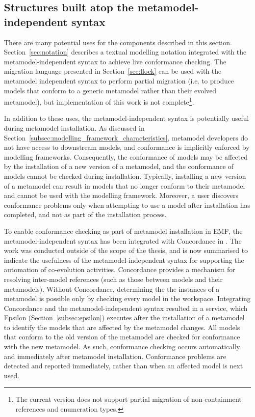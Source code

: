 \subsection{Structures built atop the metamodel-independent syntax}
There are many potential uses for the components described in this section. Section~\ref{sec:notation} describes a textual modelling notation integrated with the metamodel-independent syntax to achieve live conformance checking. The migration language presented in Section~\ref{sec:flock} can be used with the metamodel independent syntax to perform partial migration (i.e. to produce models that conform to a generic metamodel rather than their evolved metamodel), but implementation of this work is not complete\footnote{The current version does not support partial migration of non-containment references and enumeration types.}.

In addition to these uses, the metamodel-independent syntax is potentially useful during metamodel installation. As discussed in Section~\ref{subsec:modelling_framework_characteristics}, metamodel developers do not have access to downstream models, and conformance is implicitly enforced by modelling frameworks. Consequently, the conformance of models may be affected by the installation of a new version of a metamodel, and the conformance of models cannot be checked during installation. Typically, installing a new version of a metamodel can result in models that no longer conform to their metamodel and cannot be used with the modelling framework. Moreover, a user discovers conformance problems only when attempting to use a model after installation has completed, and not as part of the installation process.


To enable conformance checking as part of metamodel installation in EMF, the metamodel-independent syntax has been integrated with Concordance in \cite{rose10concordance}. The work was conducted outside of the scope of the thesis, and is now summarised to indicate the usefulness of the metamodel-independent syntax for supporting the automation of co-evolution activities. Concordance provides a mechanism for resolving inter-model references (such as those between models and their metamodels). Without Concordance, determining the the instances of a metamodel is possible only by checking every model in the workspace. Integrating Concordance and the metamodel-independent syntax resulted in a service, which Epsilon (Section~\ref{subsec:epsilon}) executes after the installation of a metamodel to identify the models that are affected by the metamodel changes. All models that conform to the old version of the metamodel are checked for conformance with the new metamodel. As such, conformance checking occurs automatically and immediately after metamodel installation. Conformance problems are detected and reported immediately, rather than when an affected model is next used.

